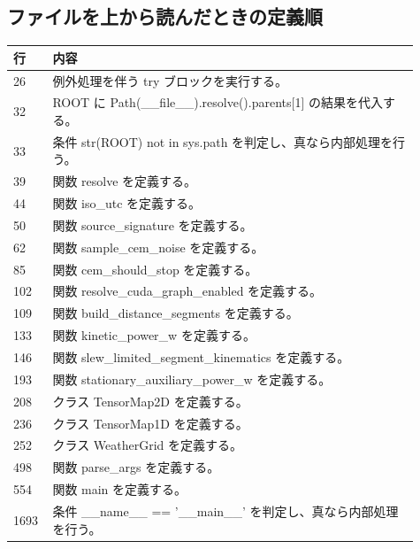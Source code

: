 \documentclass[a4paper,11pt]{article}
\begin{document}
        \subsection*{ファイルを上から読んだときの定義順}
            \begin{longtable}{p{0.07\linewidth} p{0.84\linewidth}}
            \toprule
            行 & 内容 \\
            \midrule
            26 & 例外処理を伴う try ブロックを実行する。 \\
32 & ROOT に Path(\_\_file\_\_).resolve().parents[1] の結果を代入する。 \\
33 & 条件 str(ROOT) not in sys.path を判定し、真なら内部処理を行う。 \\
39 & 関数 resolve を定義する。 \\
44 & 関数 iso\_utc を定義する。 \\
50 & 関数 source\_signature を定義する。 \\
62 & 関数 sample\_cem\_noise を定義する。 \\
85 & 関数 cem\_should\_stop を定義する。 \\
102 & 関数 resolve\_cuda\_graph\_enabled を定義する。 \\
109 & 関数 build\_distance\_segments を定義する。 \\
133 & 関数 kinetic\_power\_w を定義する。 \\
146 & 関数 slew\_limited\_segment\_kinematics を定義する。 \\
193 & 関数 stationary\_auxiliary\_power\_w を定義する。 \\
208 & クラス TensorMap2D を定義する。 \\
236 & クラス TensorMap1D を定義する。 \\
252 & クラス WeatherGrid を定義する。 \\
498 & 関数 parse\_args を定義する。 \\
554 & 関数 main を定義する。 \\
1693 & 条件 \_\_name\_\_ == '\_\_main\_\_' を判定し、真なら内部処理を行う。 \\
            \bottomrule
            \end{longtable}
\end{document}
